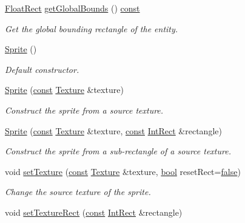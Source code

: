 \begin{DoxyCompactItemize}
\hyperlink{namespacesf_ab0d978f5903922a6bdfca1736b71ccc9}{Float\-Rect} \hyperlink{classsf_1_1_sprite_a203d2d8087bfdca2ebc3c0485cdb7409}{get\-Global\-Bounds} () \hyperlink{term__entry_8h_a57bd63ce7f9a353488880e3de6692d5a}{const} 
\begin{DoxyCompactList}\small\item\em Get the global bounding rectangle of the entity. \end{DoxyCompactList}\item 
\hyperlink{classsf_1_1_sprite_a92559fbca895a96758abf5eabab96984}{Sprite} ()
\begin{DoxyCompactList}\small\item\em Default constructor. \end{DoxyCompactList}\item 
\hyperlink{classsf_1_1_sprite_a2a9fca374d7abf084bb1c143a879ff4a}{Sprite} (\hyperlink{term__entry_8h_a57bd63ce7f9a353488880e3de6692d5a}{const} \hyperlink{classsf_1_1_texture}{Texture} \&texture)
\begin{DoxyCompactList}\small\item\em Construct the sprite from a source texture. \end{DoxyCompactList}\item 
\hyperlink{classsf_1_1_sprite_a01cfe1402372d243dbaa2ffa96020206}{Sprite} (\hyperlink{term__entry_8h_a57bd63ce7f9a353488880e3de6692d5a}{const} \hyperlink{classsf_1_1_texture}{Texture} \&texture, \hyperlink{term__entry_8h_a57bd63ce7f9a353488880e3de6692d5a}{const} \hyperlink{namespacesf_a1b1279ab06950b96686cffaacb72fed5}{Int\-Rect} \&rectangle)
\begin{DoxyCompactList}\small\item\em Construct the sprite from a sub-\/rectangle of a source texture. \end{DoxyCompactList}\item 
void \hyperlink{classsf_1_1_sprite_a3729c88d88ac38c19317c18e87242560}{set\-Texture} (\hyperlink{term__entry_8h_a57bd63ce7f9a353488880e3de6692d5a}{const} \hyperlink{classsf_1_1_texture}{Texture} \&texture, \hyperlink{term__entry_8h_a002004ba5d663f149f6c38064926abac}{bool} reset\-Rect=\hyperlink{_snake_8cpp_ae6c865df784842196d411c1466b01686}{false})
\begin{DoxyCompactList}\small\item\em Change the source texture of the sprite. \end{DoxyCompactList}\item 
void \hyperlink{classsf_1_1_sprite_a3fefec419a4e6a90c0fd54c793d82ec2}{set\-Texture\-Rect} (\hyperlink{term__entry_8h_a57bd63ce7f9a353488880e3de6692d5a}{const} \hyperlink{namespacesf_a1b1279ab06950b96686cffaacb72fed5}{Int\-Rect} \&rectangle)

\end{DoxyCompactItemize}
